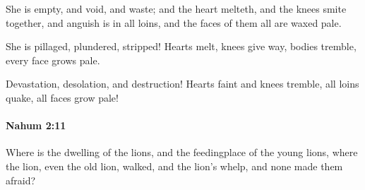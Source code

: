 			\begin{versebox}
					\item[BHS] 
					\item[LXX] 
					\item[ASV] She is empty, and void, and waste; and the heart melteth, and the knees smite together, and anguish is in all loins, and the faces of them all are waxed pale.
					\item[NIV] She is pillaged, plundered, stripped! Hearts melt, knees give way, bodies tremble, every face grows pale.
					\item[NRSV] Devastation, desolation, and destruction! Hearts faint and knees tremble, all loins quake, all faces grow pale!
			\end{versebox}

		\paragraph{Nahum 2:11} %
			\label{NAHUM-2-11}

			Where is the dwelling of the lions, and the feedingplace of the young lions, where the lion, even the old lion, walked, and the lion’s whelp, and none made them afraid?

